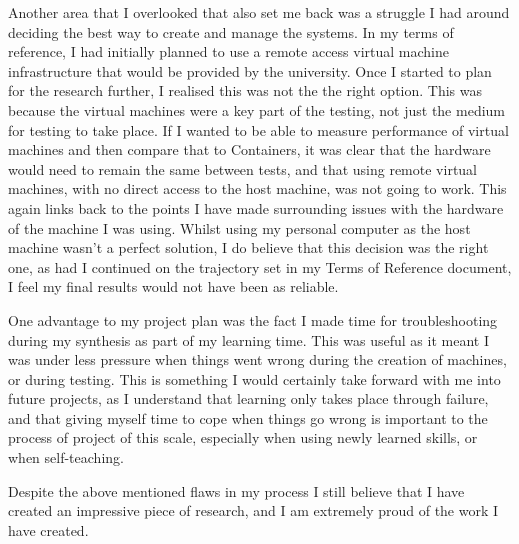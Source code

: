 Another area that I overlooked that also set me back was a struggle I had around deciding the best way to create and manage the systems. In my terms of reference, I had initially planned to use a remote access virtual machine infrastructure that would be provided by the university. Once I started to plan for the research further, I realised this was not the the right option. This was because the virtual machines were a key part of the testing, not just the medium for testing to take place. If I wanted to be able to measure performance of virtual machines and then compare that to Containers, it was clear that the hardware would need to remain the same between tests, and that using remote virtual machines, with no direct access to the host machine, was not going to work. This again links back to the points I have made surrounding issues with the hardware of the machine I was using. Whilst using my personal computer as the host machine wasn't a perfect solution, I do believe that this decision was the right one, as had I continued on the trajectory set in my Terms of Reference document, I feel my final results would not have been as reliable.

One advantage to my project plan was the fact I made time for troubleshooting during my synthesis as part of my learning time. This was useful as it meant I was under less pressure when things went wrong during the creation of machines, or during testing. This is something I would certainly take forward with me into future projects, as I understand that learning only takes place through failure, and that giving myself time to cope when things go wrong is important to the process of project of this scale, especially when using newly learned skills, or when self-teaching.


Despite the above mentioned flaws in my process I still believe that I have created an impressive piece of research, and I am extremely proud of the work I have created.